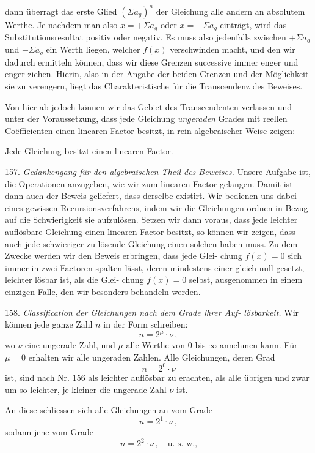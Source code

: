 dann überragt das erste Glied $(\Sigma a_g)^n$ der Gleichung alle andern an
absolutem Werthe. Je nachdem man also $x=+\Sigma a_g$ oder $x=-\Sigma a_g$
einträgt, wird das Substitutionsresultat positiv oder negativ. Es muss
also jedenfalls zwischen $+\Sigma a_g$ und $-\Sigma a_g$ ein Werth liegen, welcher
$f(x)$ verschwinden macht, und den wir dadurch ermitteln können, dass
wir diese Grenzen successive immer enger und enger ziehen. Hierin,
also in der Angabe der beiden Grenzen und der Möglichkeit sie zu
verengern, liegt das Charakteristische für die Transcendenz des Beweises.

Von hier ab jedoch können wir das Gebiet des Transcendenten
verlassen und unter der Voraussetzung, dass jede Gleichung \emph{ungeraden}
Grades mit reellen Co\"efficienten einen linearen Factor besitzt, in rein
algebraischer Weise zeigen:

\glqq Jede Gleichung besitzt einen linearen Factor.\grqq{}

157. \emph{Gedankengang für den algebraischen Theil des Beweises.} Unsere
Aufgabe ist, die Operationen anzugeben, wie wir zum linearen Factor
gelangen. Damit ist dann auch der Beweis geliefert, dass derselbe
existirt. Wir bedienen uns dabei eines gewissen Recursionsverfahrens,
indem wir die Gleichungen ordnen in Bezug auf die Schwierigkeit sie
aufzulösen. Setzen wir dann voraus, dass jede leichter auflösbare
Gleichung einen linearen Factor besitzt, so können wir zeigen, dass
auch jede schwieriger zu lösende Gleichung einen solchen haben muss.
Zu dem Zwecke werden wir den Beweis erbringen, dass jede Glei-
chung $f(x)=0$ sich immer in zwei Factoren spalten lässt, deren
mindestens einer gleich null gesetzt, leichter lösbar ist, als die Glei-
chung $f(x)=0$ selbst, ausgenommen in einem einzigen Falle, den
wir besonders behandeln werden.

158. \emph{Classification der Gleichungen nach dem Grade ihrer Auf-
lösbarkeit.} Wir können jede ganze Zahl $n$ in der Form schreiben:
\[ n = 2^{\mu}\cdot \nu\, , \]
wo $\nu$ eine ungerade Zahl, und $\mu$ alle Werthe von 0 bis $\infty$ annehmen
kann. Für $\mu=0$ erhalten wir alle ungeraden Zahlen. Alle Gleichungen,
deren Grad
\[ n = 2^{0}\cdot \nu \]
ist, sind nach Nr. 156 als leichter auflösbar zu erachten, als alle
übrigen und zwar um so leichter, je kleiner die ungerade Zahl $\nu$ ist.

An diese schliessen sich alle Gleichungen an vom Grade
\[ n = 2^{1}\cdot \nu\, , \]
sodann jene vom Grade
\[ n = 2^{2}\cdot \nu\, , \quad \text{u. s. w.,} \]


